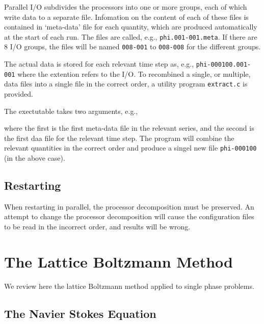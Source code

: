 Parallel I/O subdivides the processors into one or more groups,
each of which write data to a separate file. Infomation on the
content of each of these files is contained in `meta-data' file
for each quantity, which are produced automatically at the start
of each run. The files are called, e.g., \texttt{phi.001-001.meta}.
If there are 8 I/O groups, the files will be named \texttt{008-001}
to \texttt{008-008} for the different groups.

The actual data is stored for each relevant time step as, e.g.,
\texttt{phi-000100.001-001} where the extention refers to the
I/O. To recombined a single, or multiple, data files into a
single file in the correct order, a utility program
\texttt{extract.c} is provided.

The exectutable takes two arguments, e.g.,


where  the first is the first meta-data file in the relevant series,
and the second is the first daa file for the relevant time step. The
program will combine the relevant quantities in the correct order
and produce a singel new file \texttt{phi-000100} (in the above case).

\subsection{Restarting}

When restarting in parallel, the processor decomposition must be
preserved. An attempt to change the processor decomposition will
cause the configuration files to be read in the incorrect order,
and results will be wrong.


\section{The Lattice Boltzmann Method}

We review here the lattice Boltzmann method applied to single
phase problems.

\subsection{The Navier Stokes Equation}

